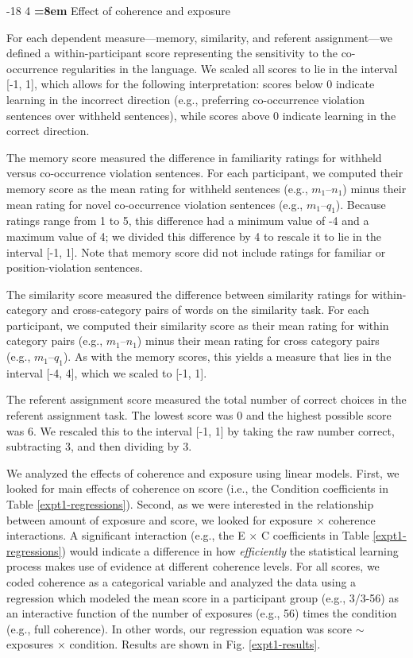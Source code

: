 \documentclass[man,longtable, floatmark]{my-apa6}
\makeatletter
\renewcommand\subsubsection{\@startsection{subsubsection}{3}{\z@}%
                       {-18\p@ \@plus -4\p@ \@minus -4\p@}%
                       {4\p@ \@plus 2\p@ \@minus 2\p@}%
                       {\normalfont\normalsize\bfseries\boldmath
                        \rightskip=\z@ \@plus 8em\pretolerance=10000 }}
\makeatother
\begin{document}
\subsubsection{Effect of coherence and exposure}

For each dependent measure---memory, similarity, and referent assignment---we defined a within-participant score representing the sensitivity to the co-occurrence regularities in the language. We scaled all scores to lie in the interval [-1, 1], which allows for the following interpretation: scores below 0 indicate learning in the incorrect direction (e.g., preferring co-occurrence violation sentences over withheld sentences), while scores above 0 indicate learning in the correct direction.

The memory score measured the difference in familiarity ratings for withheld versus co-occurrence violation sentences. For each participant, we computed their memory score as the mean rating for withheld sentences (e.g., $m_1$--$n_1$) minus their mean rating for novel co-occurrence violation sentences (e.g., $m_1$--$q_1$). Because ratings range from 1 to 5, this difference had a minimum value of -4 and a maximum value of 4; we divided this difference by 4 to rescale it to lie in the interval [-1, 1]. Note that memory score did not include ratings for familiar or position-violation sentences.

The similarity score measured the difference between similarity ratings for within-category and cross-category pairs of words on the similarity task. For each participant, we computed their similarity score as their mean rating for within category pairs (e.g., $m_1$--$n_1$) minus their mean rating for cross category pairs (e.g., $m_1$--$q_1$). As with the memory scores, this yields a measure that lies in the interval [-4, 4], which we scaled to [-1, 1].

The referent assignment score measured the total number of correct choices in the referent assignment task. The lowest score was 0 and the highest possible score was 6. We rescaled this to the interval [-1, 1] by taking the raw number correct, subtracting 3, and then dividing by 3.

We analyzed the effects of coherence and exposure using linear models. First, we looked for main effects of coherence on score (i.e., the Condition coefficients in Table \ref{expt1-regressions}). Second, as we were interested in the relationship between amount of exposure and score, we looked for exposure $\times$ coherence interactions. A significant interaction (e.g., the E $\times$ C coefficients in Table \ref{expt1-regressions}) would indicate a difference in how \emph{efficiently} the statistical learning process makes use of evidence at different coherence levels. For all scores, we coded coherence as a categorical variable and analyzed the data using a regression which modeled the mean score in a participant group (e.g., 3/3-56) as an interactive function of the number of exposures (e.g., 56) times the condition (e.g., full coherence). In other words, our regression equation was score $\sim$ exposures $\times$ condition. Results are shown in Fig. \ref{expt1-results}.
\end{document}
